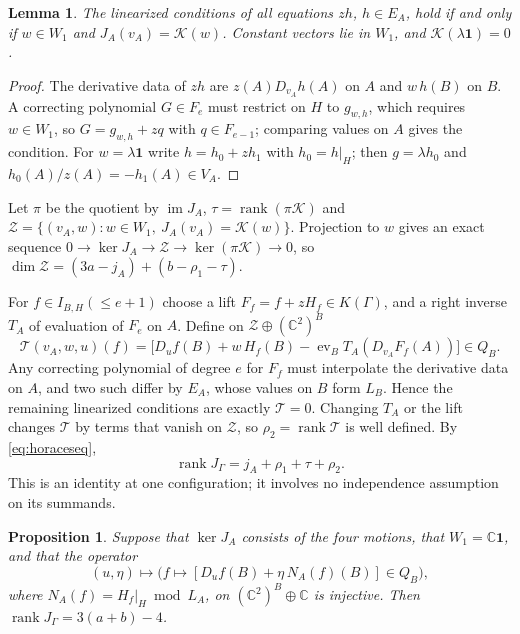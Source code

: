 \documentclass{amsart}
\newtheorem{proposition}[theorem]{Proposition}
\newtheorem{lemma}[theorem]{Lemma}
\theoremstyle{definition}
\theoremstyle{remark}
\numberwithin{equation}{section}
\newcommand{\CC}{\mathbb{C}}
\DeclareMathOperator{\ev}{ev}
\DeclareMathOperator{\rank}{rank}
\begin{document}
\begin{lemma}\label{lem:horacenormal}
The linearized conditions of all equations $zh$, $h\in E_A$, hold if and only if
$w\in W_1$ and $J_A(v_A)=\mathcal K(w)$. Constant vectors lie in $W_1$, and
$\mathcal K(\lambda\mathbf1)=0$.
\end{lemma}

\begin{proof}
The derivative data of $zh$ are $z(A)D_{v_A}h(A)$ on $A$ and $w\,h(B)$ on $B$. A
correcting polynomial $G\in F_e$ must restrict on $H$ to $g_{w,h}$, which requires
$w\in W_1$, so $G=g_{w,h}+zq$ with $q\in F_{e-1}$; comparing values on $A$ gives the
condition. For $w=\lambda\mathbf1$ write $h=h_0+zh_1$ with $h_0=h|_H$; then
$g=\lambda h_0$ and $h_0(A)/z(A)=-h_1(A)\in V_A$.
\end{proof}

Let $\pi$ be the quotient by $\operatorname{im}J_A$, $\tau=\rank(\pi\mathcal K)$ and
$\mathcal Z=\{(v_A,w):w\in W_1,\ J_A(v_A)=\mathcal K(w)\}$. Projection to $w$ gives an
exact sequence $0\to\ker J_A\to\mathcal Z\to\ker(\pi\mathcal K)\to0$, so
$\dim\mathcal Z=(3a-j_A)+(b-\rho_1-\tau)$.

For $f\in I_{B,H}(\le e+1)$ choose a lift $F_f=f+zH_f\in K(\Gamma)$, and a right inverse
$T_A$ of evaluation of $F_e$ on $A$. Define on $\mathcal Z\oplus(\CC^2)^B$
\[
  \mathcal T(v_A,w,u)(f)=\bigl[D_uf(B)+w\,H_f(B)-\ev_BT_A(D_{v_A}F_f(A))\bigr]\in Q_B .
\]
Any correcting polynomial of degree $e$ for $F_f$ must interpolate the derivative data
on $A$, and two such differ by $E_A$, whose values on $B$ form $L_B$. Hence the
remaining linearized conditions are exactly $\mathcal T=0$. Changing $T_A$ or the lift
changes $\mathcal T$ by terms that vanish on $\mathcal Z$, so $\rho_2=\rank\mathcal T$ is
well defined. By \eqref{eq:horaceseq},
\begin{equation}\label{eq:coupled}
  \rank J_\Gamma=j_A+\rho_1+\tau+\rho_2 .
\end{equation}
This is an identity at one configuration; it involves no independence assumption on
its summands.

\begin{proposition}\label{prop:separated}
Suppose that $\ker J_A$ consists of the four motions, that $W_1=\CC\mathbf1$, and that
the operator
\begin{equation}\label{eq:R2op}
  (u,\eta)\longmapsto\bigl(f\mapsto[D_uf(B)+\eta\,N_A(f)(B)]\in Q_B\bigr),
\end{equation}
where $N_A(f)=H_f|_H\bmod L_A$,
on $(\CC^2)^B\oplus\CC$ is injective. Then $\rank J_\Gamma=3(a+b)-4$.
\end{proposition}
\end{document}
